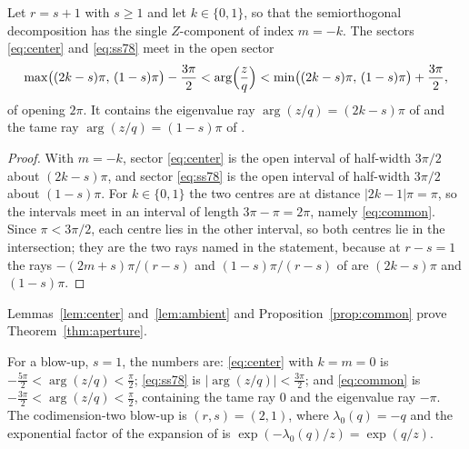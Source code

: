 \begin{proposition}
  \label{prop:common}
  Let \(r=s+1\) with \(s\ge1\) and let \(k\in\{0,1\}\), so that the
  semiorthogonal decomposition \cite[Theorem~1.1]{SS} has the single
  \(Z\)-component of index \(m=-k\).  The sectors \eqref{eq:center} and
  \eqref{eq:ss78} meet in the open sector
  \begin{equation}
    \label{eq:common}
    \max\bigl((2k-s)\pi,\,(1-s)\pi\bigr)-\frac{3\pi}{2}
    <\arg\Bigl(\frac zq\Bigr)<
    \min\bigl((2k-s)\pi,\,(1-s)\pi\bigr)+\frac{3\pi}{2},
  \end{equation}
  of opening \(2\pi\).  It contains the eigenvalue ray
  \(\arg(z/q)=(2k-s)\pi\) of \cite[Theorem~1.4(1)]{SS} and the tame ray
  \(\arg(z/q)=(1-s)\pi\) of \cite[Theorem~1.4(2)]{SS}.
\end{proposition}

\begin{proof}
  With \(m=-k\), sector \eqref{eq:center} is the open interval of half-width
  \(3\pi/2\) about \((2k-s)\pi\), and sector \eqref{eq:ss78} is the open
  interval of half-width \(3\pi/2\) about \((1-s)\pi\).  For \(k\in\{0,1\}\)
  the two centres are at distance \(|2k-1|\pi=\pi\), so the intervals meet in
  an interval of length \(3\pi-\pi=2\pi\), namely \eqref{eq:common}.  Since
  \(\pi<3\pi/2\), each centre lies in the other interval, so both centres lie
  in the intersection; they are the two rays named in the statement, because
  at \(r-s=1\) the rays \(-(2m+s)\pi/(r-s)\) and \((1-s)\pi/(r-s)\) of
  \cite[Theorem~1.4]{SS} are \((2k-s)\pi\) and \((1-s)\pi\).
\end{proof}

Lemmas~\ref{lem:center} and~\ref{lem:ambient} and
Proposition~\ref{prop:common} prove Theorem~\ref{thm:aperture}.

\begin{remark}
  \label{rem:blowup}
  For a blow-up, \(s=1\), the numbers are: \eqref{eq:center} with \(k=m=0\)
  is \(-\tfrac{5\pi}{2}<\arg(z/q)<\tfrac\pi2\); \eqref{eq:ss78} is
  \(|\arg(z/q)|<\tfrac{3\pi}{2}\); and \eqref{eq:common} is
  \(-\tfrac{3\pi}{2}<\arg(z/q)<\tfrac\pi2\), containing the tame ray \(0\)
  and the eigenvalue ray \(-\pi\).  The codimension-two blow-up is
  \((r,s)=(2,1)\), where \(\lambda_{0}(q)=-q\) and the exponential factor of
  the expansion of \cite[Proposition~7.5]{SS} is
  \(\exp(-\lambda_{0}(q)/z)=\exp(q/z)\).
\end{remark}

